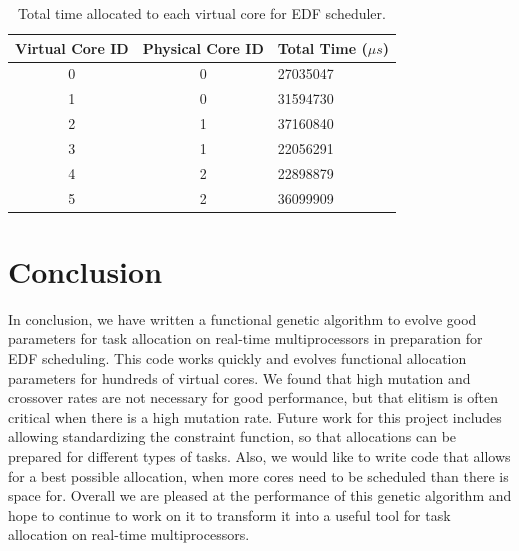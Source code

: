 \documentclass[11pt]{article}
\begin{document}
\begin{table}[H]
\centering
\renewcommand{\arraystretch}{1.2}

 \begin{tabularx}{275pt}{ | c | c | X | }
 \hline
Virtual Core ID & Physical Core ID & Total Time ($\mu$$s$) \\ \hline

0 & 0 & 27035047 \\ \hline

1 & 0 & 31594730 \\ \hline

2 & 1 & 37160840 \\ \hline

3 & 1 & 22056291 \\ \hline

4 & 2 & 22898879 \\ \hline

5 & 2 & 36099909 \\ \hline

\end{tabularx}
\caption{Total time allocated to each virtual core for EDF scheduler.}
 \label{tab:table2}
\end{table}

\section{Conclusion}

In conclusion, we have written a functional genetic algorithm to evolve good parameters for task allocation on real-time multiprocessors in preparation for EDF scheduling. This code works quickly and evolves functional allocation parameters for hundreds of virtual cores. We found that high mutation and crossover rates are not necessary for good performance, but that elitism is often critical when there is a high mutation rate. Future work for this project includes allowing standardizing the constraint function, so that allocations can be prepared for different types of tasks. Also, we would like to write code that allows for a best possible allocation, when more cores need to be scheduled than there is space for. Overall we are pleased at the performance of this genetic algorithm and hope to continue to work on it to transform it into a useful tool for task allocation on real-time multiprocessors.



\end{document}
